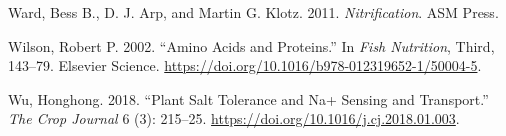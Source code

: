 \documentclass[
]{article}
\newlength{\cslhangindent}
\newlength{\cslentryspacingunit} %
\newenvironment{CSLReferences}[2] %
 {%
  \setlength{\parindent}{0pt}
  \ifodd #1
  \let\oldpar\par
  \def\par{\hangindent=\cslhangindent\oldpar}
  \fi
  \setlength{\parskip}{#2\cslentryspacingunit}
 }%
 {}
\begin{document}
\begin{CSLReferences}{1}{0}
\leavevmode{}%
Ward, Bess B., D. J. Arp, and Martin G. Klotz. 2011. \emph{Nitrification}. ASM Press.

\leavevmode{}%
Wilson, Robert P. 2002. {``{Amino Acids and Proteins}.''} In \emph{Fish Nutrition}, Third, 143--79. Elsevier Science. \url{https://doi.org/10.1016/b978-012319652-1/50004-5}.

\leavevmode{}%
Wu, Honghong. 2018. {``Plant Salt Tolerance and Na+ Sensing and Transport.''} \emph{The Crop Journal} 6 (3): 215--25. \url{https://doi.org/10.1016/j.cj.2018.01.003}.

\end{CSLReferences}
\end{document}
